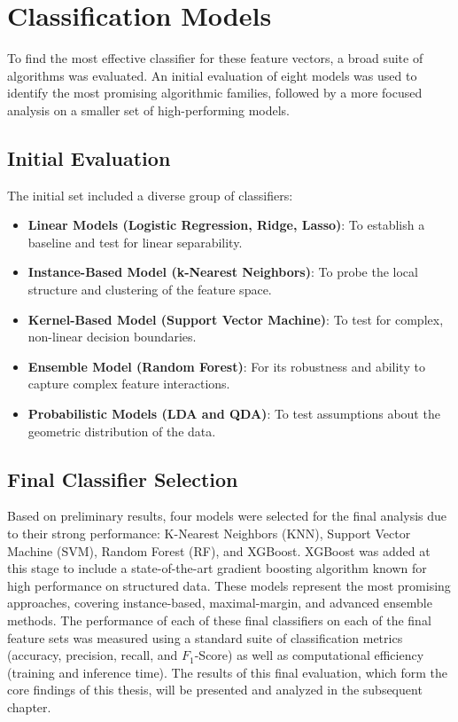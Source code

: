 \section{Classification Models}\label{ch:3.6}
To find the most effective classifier for these feature vectors, a broad suite of algorithms was evaluated. An initial evaluation of eight models was used to identify the most promising algorithmic families, followed by a more focused analysis on a smaller set of high-performing models.

\subsection{Initial Evaluation}\label{ch:3.6.1}
The initial set included a diverse group of classifiers:
\begin{itemize}
    \item \textbf{Linear Models (Logistic Regression, Ridge, Lasso)}: To establish a baseline and test for linear separability.
    \item \textbf{Instance-Based Model (k-Nearest Neighbors)}: To probe the local structure and clustering of the feature space.
    \item \textbf{Kernel-Based Model (Support Vector Machine)}: To test for complex, non-linear decision boundaries.
    \item \textbf{Ensemble Model (Random Forest)}: For its robustness and ability to capture complex feature interactions.
    \item \textbf{Probabilistic Models (LDA and QDA)}: To test assumptions about the geometric distribution of the data.
\end{itemize}

\subsection{Final Classifier Selection}\label{ch:3.6.2}
Based on preliminary results, four models were selected for the final analysis due to their strong performance: K-Nearest Neighbors (KNN), Support Vector Machine (SVM), Random Forest (RF), and XGBoost. XGBoost was added at this stage to include a state-of-the-art gradient boosting algorithm known for high performance on structured data. These models represent the most promising approaches, covering instance-based, maximal-margin, and advanced ensemble methods. The performance of each of these final classifiers on each of the final feature sets was measured using a standard suite of classification metrics (accuracy, precision, recall, and \(F_1\)-Score) as well as computational efficiency (training and inference time). The results of this final evaluation, which form the core findings of this thesis, will be presented and analyzed in the subsequent chapter.